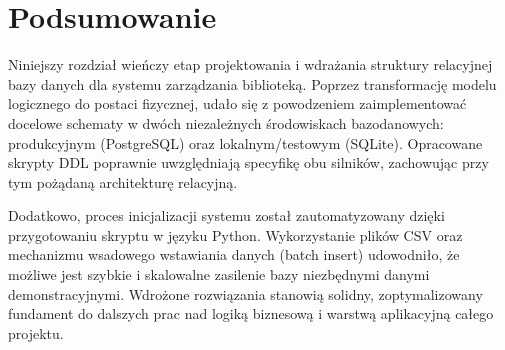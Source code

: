 \documentclass[letterpaper,10pt,english]{sphinxmanual}
\begin{document}
\begin{sphinxVerbatim}[commandchars=\\\{\}]

       
\end{sphinxVerbatim}


\section{Podsumowanie}
\label{\detokenize{rozdzial_4/index:podsumowanie}}
\sphinxAtStartPar
Niniejszy rozdział wieńczy etap projektowania i wdrażania struktury relacyjnej bazy danych dla systemu zarządzania biblioteką. Poprzez transformację modelu logicznego do postaci fizycznej, udało się z powodzeniem zaimplementować docelowe schematy w dwóch niezależnych środowiskach bazodanowych: produkcyjnym (PostgreSQL) oraz lokalnym/testowym (SQLite). Opracowane skrypty DDL poprawnie uwzględniają specyfikę obu silników, zachowując przy tym pożądaną architekturę relacyjną.

\sphinxAtStartPar
Dodatkowo, proces inicjalizacji systemu został zautomatyzowany dzięki przygotowaniu skryptu w języku Python. Wykorzystanie plików CSV oraz mechanizmu wsadowego wstawiania danych (batch insert) udowodniło, że możliwe jest szybkie i skalowalne zasilenie bazy niezbędnymi danymi demonstracyjnymi. Wdrożone rozwiązania stanowią solidny, zoptymalizowany fundament do dalszych prac nad logiką biznesową i warstwą aplikacyjną całego projektu.



\renewcommand{\indexname}{Index}
\printindex
\end{document}
